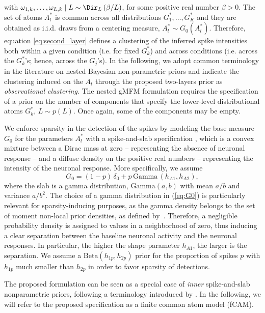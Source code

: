 with $\omega_{1,k},\dots,\omega_{L,k} \mid L\sim \Dir_L\left(\beta/L\right)$, for some positive real number $\beta>0$. The set of atoms $A_l^*$ is common across all distributions $G_1^*, \ldots, G_K^*$ and they are obtained as i.i.d. draws from a centering measure, \(A^*_l \sim G_0(A^*_l)\). Therefore, equation \eqref{eq:second_layer} defines a clustering of the inferred spike intensities both within a given condition (i.e. for fixed $G_k^*$) and across conditions (i.e. across the $G_k^*$'s; hence, across the $G_j$'s). In the following, we adopt common terminology in the literature on nested Bayesian non-parametric priors and indicate the clustering induced on the $A_t$ through the proposed two-layers prior as \textit{observational clustering}. The nested gMFM formulation requires the specification of a prior on the number of components that specify the lower-level distributional atoms $G_k^*$, \(L\sim p(L)\). Once again, some of the components may be empty. 

We enforce sparsity in the detection of the spikes by modeling the base measure $G_0$ for the parameters $A^*_{l}$ with a spike-and-slab specification \parencite{mitchell1988}, which is a convex mixture between a Dirac mass at zero -- representing the absence of neuronal response -- and a diffuse density on the positive real numbers -- representing the intensity of the neuronal response. More specifically, we assume
\begin{equation}
G_0 = (1-p) \, \delta_0 + p\, \mathrm{Gamma}\,(h_{A1},h_{A2}),
\label{eq:G0}
\end{equation}
where the slab is a gamma distribution, $\mathrm{Gamma}(a,b)$ with mean $a/b$ and variance $a/b^2$. The choice of a gamma distribution in (\ref{eq:G0}) is particularly relevant for sparsity-inducing purposes, as the gamma density belongs to the set of moment non-local prior densities, as defined by~\textcite{johnson2010}. Therefore, a negligible probability density is assigned to values in a neighborhood of zero, thus inducing a clear separation between the baseline neuronal activity and the neuronal responses. In particular, the higher the shape parameter $h_{A1}$, the larger is the separation. We assume a $ \mathrm{Beta}(h_{1p}, h_{2p})$ prior for the proportion of spikes $p$ with $h_{1p} $ much smaller than $h_{2p}$ in order to favor sparsity of detections.

The proposed formulation can be seen as a special case of \textit{inner} spike-and-slab nonparametric priors, following a terminology introduced by \textcite{canale2017,spikeandslab2}. In the following, we will refer to the proposed specification as a finite common atom model (fCAM). 


